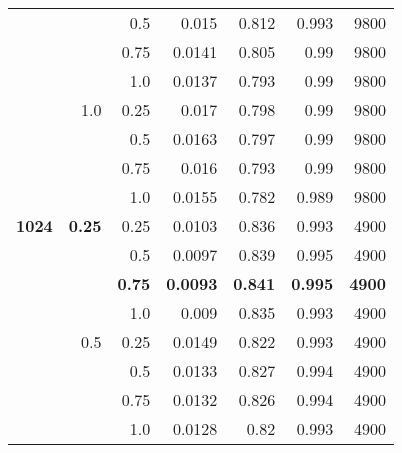 \begin{table}[H]
{\begin{tabular}{rrrrrrr}
              &               & 0.5           & 0.015                & 0.812                   & 0.993                   & 9800          \\
              &               & 0.75          & 0.0141               & 0.805                   & 0.99                    & 9800          \\
              &               & 1.0           & 0.0137               & 0.793                   & 0.99                    & 9800          \\
              & 1.0           & 0.25          & 0.017                & 0.798                   & 0.99                    & 9800          \\
              &               & 0.5           & 0.0163               & 0.797                   & 0.99                    & 9800          \\
              &               & 0.75          & 0.016                & 0.793                   & 0.99                    & 9800          \\
              &               & 1.0           & 0.0155               & 0.782                   & 0.989                   & 9800          \\
\textbf{1024} & \textbf{0.25}          & 0.25          & 0.0103               & 0.836                   & 0.993                   & 4900          \\
              &               & 0.5           & 0.0097               & 0.839                   & 0.995                   & 4900          \\
              &               & \textbf{0.75} & \textbf{0.0093}      & \textbf{0.841}          & \textbf{0.995}          & \textbf{4900} \\
              &               & 1.0           & 0.009                & 0.835                   & 0.993                   & 4900          \\
              & 0.5           & 0.25          & 0.0149               & 0.822                   & 0.993                   & 4900          \\
              &               & 0.5           & 0.0133               & 0.827                   & 0.994                   & 4900          \\
              &               & 0.75          & 0.0132               & 0.826                   & 0.994                   & 4900          \\
              &               & 1.0           & 0.0128               & 0.82                    & 0.993                   & 4900          \\

\end{tabular}}
\end{table}
